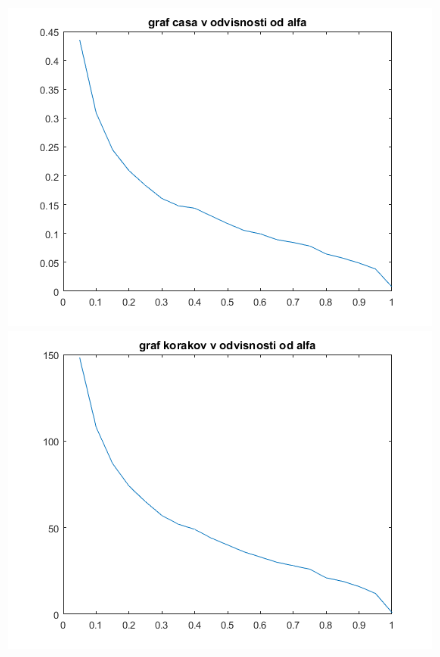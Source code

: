 \documentclass[11pt]{article} %
\begin{document}
\begin{figure}[ht]
\centering
\begin{minipage}{.5\textwidth}
\centering
\includegraphics[scale=0.5]{cas}
\end{minipage}%
\begin{minipage}{.5\textwidth}
\centering
\includegraphics[scale=0.5]{koraki}
\end{minipage}
\end{figure}
\end{document}
